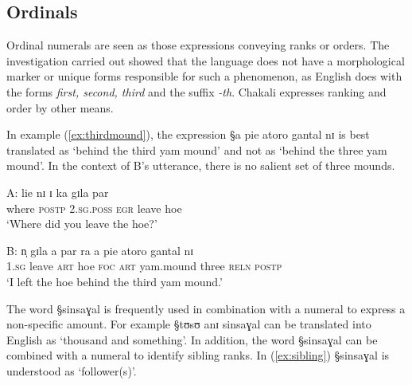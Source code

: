 \subsection{Ordinals}
\label{sec:NUM-partitive}

Ordinal numerals are seen as those expressions conveying ranks or orders. The
investigation carried out  showed that the language
does not have a morphological marker or unique forms responsible for such a
phenomenon, as English does with the forms \textit{first, second,
third} and the suffix \textit{-th}. Chakali expresses ranking and order by other
means.


In example (\ref{ex:thirdmound}),  the expression {\S a pie atoro  gantal nɪ} is
best translated as `behind the third yam mound' and not as `behind the three yam
mound'. In the context of B's utterance, there is no  salient set of three
mounds.  



\begin{exe}
\ex\label{ex:thirdmound}
\gll A: lie nɪ ɪ ka gɪla par    \\
    {} {where} \textsc{postp}  \textsc{2.sg.poss}  \textsc{egr} {leave} {hoe}
\\
\glt   `Where did you leave the hoe?'

\gll B: n̩ gɪla a par ra a   pie atoro  gantal  nɪ    \\
    {}  \textsc{1.sg}  {leave} \textsc{art}   {hoe} \textsc{foc} 
\textsc{art} {yam.mound} {three} \textsc{reln}  \textsc{postp} \\
\glt   `I left the hoe behind the third yam mound.'
\end{exe}


The word  {\S sinsaɣal} is frequently  used in combination with a numeral to
express a non-specific amount. For example  {\S tʊsʊ anɪ sinsaɣal}  can be
translated into English as  `thousand and something'. In addition,  the word 
{\S sinsaɣal} can be combined with a numeral to identify sibling ranks. In 
(\ref{ex:sibling})  {\S sinsaɣal} is understood as `follower(s)'.  


